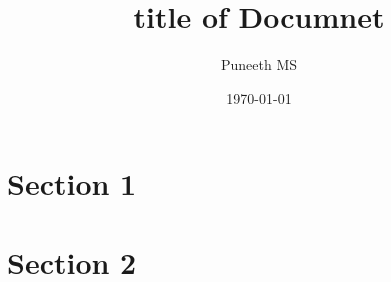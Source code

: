 \documentclass{article}
\begin{document}
\title{title of Documnet}
\author{Puneeth MS}
\date{\today}
\maketitle
\section{Section 1}
\lipsum[1]
\section{Section 2}
\lipsum[2]
\end{document}
